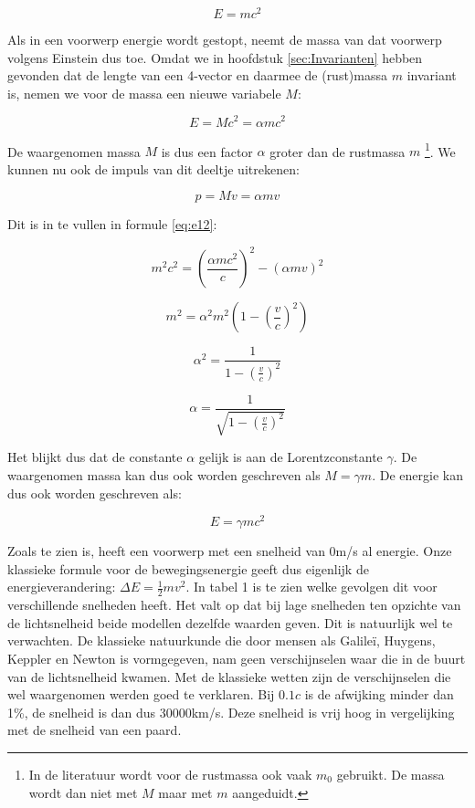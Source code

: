 \begin{equation}
E=mc^{2}
\end{equation}


Als in een voorwerp energie wordt gestopt, neemt de massa van dat
voorwerp volgens Einstein dus toe. Omdat we in hoofdstuk \ref{sec:Invarianten}
hebben gevonden dat de lengte van een 4-vector en daarmee de (rust)massa
$m$ invariant is, nemen we voor de massa een nieuwe variabele $M$:

\begin{equation}
E=Mc^{2}=\alpha mc^{2}
\end{equation}


De waargenomen massa $M$ is dus een factor $\alpha$ groter dan de
rustmassa $m$ \footnote{In de literatuur wordt voor de rustmassa ook
vaak $m_{0}$ gebruikt. De massa wordt dan niet met $M$ maar met $m$
aangeduidt.}. We kunnen nu ook de impuls van dit deeltje uitrekenen:

\begin{equation}
p=Mv=\alpha mv
\end{equation}


Dit is in te vullen in formule \ref{eq:e12}:

\begin{equation}
m^{2}c^{2}=\left(\frac{\alpha mc^{2}}{c}\right)^{2}-\left(\alpha mv\right)^{2}
\end{equation}


\begin{equation}
m^{2}=\alpha^{2}m^{2}\left(1-\left(\frac{v}{c}\right)^{2}\right)
\end{equation}


\begin{equation}
\alpha^{2}=\frac{1}{1-\left(\frac{v}{c}\right)^{2}}
\end{equation}


\begin{equation}
\alpha=\frac{1}{\sqrt{1-\left(\frac{v}{c}\right)^{2}}}
\end{equation}


Het blijkt dus dat de constante $\alpha$ gelijk is aan de Lorentzconstante
$\gamma$. De waargenomen massa kan dus ook worden geschreven als
$M=\gamma m$. De energie kan dus ook worden geschreven als:

\begin{equation}
E=\gamma mc^{2}
\end{equation}


Zoals te zien is, heeft een voorwerp met een snelheid van 0m/s al
energie. Onze klassieke formule voor de bewe\-gingsenergie geeft
dus eigenlijk de e\-ner\-giever\-andering: $\Delta E=\frac{1}{2}mv^{2}$.
In tabel 1 is te zien welke gevolgen dit voor verschillende snelheden
heeft. Het valt op dat bij lage snelheden ten opzichte van de lichtsnelheid
beide modellen dezelfde waarden geven. Dit is natuurlijk wel te verwachten.
De klassieke natuurkunde die door mensen als Galileï, Huygens, Keppler
en Newton is vormgegeven, nam geen verschijnselen waar die in de buurt
van de lichtsnelheid kwamen. Met de klassieke wetten zijn de verschijnselen
die wel waargenomen werden goed te verklaren. Bij $0.1c$ is de afwijking
minder dan 1\%, de snelheid is dan dus 30000km/s. Deze snelheid is
vrij hoog in vergelijking met de snelheid van een paard.

